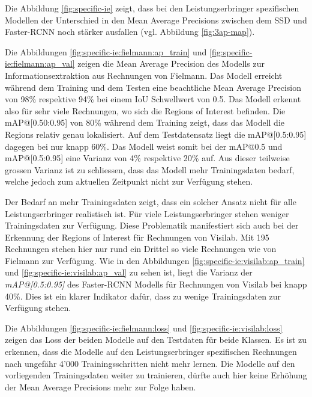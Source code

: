 Die Abbildung \ref{fig:specific-ie} zeigt, dass bei den Leistungserbringer spezifischen Modellen der Unterschied in den Mean Average Precisions zwischen dem SSD und Faster-RCNN noch stärker ausfallen (vgl. Abbildung \ref{fig:3ap-map}).

Die Abbildungen \ref{fig:specific-ie:fielmann:ap_train} und \ref{fig:specific-ie:fielmann:ap_val} zeigen die Mean Average Precision des Modells zur Informationsextraktion aus Rechnungen von Fielmann. Das Modell erreicht während dem Training und dem Testen eine beachtliche Mean Average Precision von 98\% respektive 94\% bei einem IoU Schwellwert von 0.5. Das Modell erkennt also für sehr viele Rechnungen, wo sich die Regions of Interest befinden. Die mAP@[0.50:0.95] von 80\% während dem Training zeigt, dass das Modell die Regions relativ genau lokalisiert. Auf dem Testdatensatz liegt die mAP@[0.5:0.95] dagegen bei nur knapp 60\%. Das Modell weist somit bei der mAP@0.5 und mAP@[0.5:0.95] eine Varianz von 4\% respektive 20\% auf. Aus dieser teilweise grossen Varianz ist zu schliessen, dass das Modell mehr Trainingsdaten bedarf, welche jedoch zum aktuellen Zeitpunkt nicht zur Verfügung stehen.

Der Bedarf an mehr Trainingsdaten zeigt, dass ein solcher Ansatz nicht für alle Leistungserbringer realistisch ist. Für viele Leistungserbringer stehen weniger Trainingsdaten zur Verfügung. Diese Problematik manifestiert sich auch bei der Erkennung der Regions of Interest für Rechnungen von Visilab. Mit 195 Rechnungen stehen hier nur rund ein Drittel so viele Rechnungen wie von Fielmann zur Verfügung. Wie in den Abbildungen \ref{fig:specific-ie:visilab:ap_train} und \ref{fig:specific-ie:visilab:ap_val} zu sehen ist, liegt die Varianz der \textit{mAP@[0.5:0.95]} des Faster-RCNN Modells für Rechnungen von Visilab bei knapp 40\%. Dies ist ein klarer Indikator dafür, dass zu wenige Trainingsdaten zur Verfügung stehen.

Die Abbildungen \ref{fig:specific-ie:fielmann:loss} und \ref{fig:specific-ie:visilab:loss} zeigen das Loss der beiden Modelle auf den Testdaten für beide Klassen. Es ist zu erkennen, dass die Modelle auf den Leistungserbringer spezifischen Rechnungen nach ungefähr 4'000 Trainingsschritten nicht mehr lernen. Die Modelle auf den vorliegenden Trainingsdaten weiter zu trainieren, dürfte auch hier keine Erhöhung der Mean Average Precisions mehr zur Folge haben.

